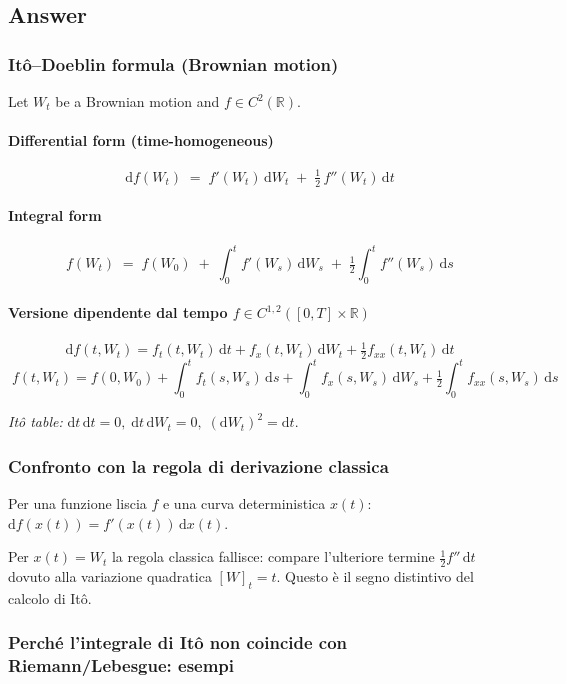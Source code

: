 \documentclass[12pt,a4paper]{book}
\theoremstyle{remark}
\newcommand{\RR}{\mathbb{R}}
\newcommand{\dd}{\mathrm{d}}
\begin{document}
\subsection*{Answer}

\subsubsection*{It\^o--Doeblin formula (Brownian motion)}
Let $W_t$ be a Brownian motion and $f\in C^2(\RR)$.

\paragraph{Differential form (time-homogeneous)}
\[
\boxed{\; \dd f(W_t) \;=\; f'(W_t)\,\dd W_t \;+\; \tfrac12\,f''(W_t)\,\dd t \;}
\]

\paragraph{Integral form}
\[
\boxed{\; f(W_t) \;=\; f(W_0) \;+\; \int_0^t f'(W_s)\,\dd W_s \;+\; \tfrac12\int_0^t f''(W_s)\,\dd s \;}
\]

\paragraph{Versione dipendente dal tempo $f\in C^{1,2}([0,T]\times\RR)$}
\[
\boxed{\; \dd f(t,W_t)= f_t(t,W_t)\,\dd t + f_x(t,W_t)\,\dd W_t + \tfrac12 f_{xx}(t,W_t)\,\dd t \;}
\]
\[
\boxed{\; f(t,W_t)= f(0,W_0)+ \int_0^t f_t(s,W_s)\,\dd s + \int_0^t f_x(s,W_s)\,\dd W_s + \tfrac12\int_0^t f_{xx}(s,W_s)\,\dd s \;}
\]

\medskip
\noindent\textit{It\^o table:} \; $\dd t\,\dd t=0,\; \dd t\,\dd W_t=0,\; (\dd W_t)^2=\dd t.$

\subsubsection*{Confronto con la regola di derivazione classica}
Per una funzione liscia $f$ e una curva deterministica $x(t)$: \; $\dd f(x(t)) = f'(x(t))\,\dd x(t)$.
\medskip

Per $x(t)=W_t$ la regola classica fallisce: compare l’ulteriore termine $\tfrac12 f''\,\dd t$ dovuto alla variazione quadratica $[W]_t=t$. Questo è il segno distintivo del calcolo di It\^o.

\subsubsection*{Perché l’integrale di It\^o non coincide con Riemann/Lebesgue: esempi}
\end{document}
